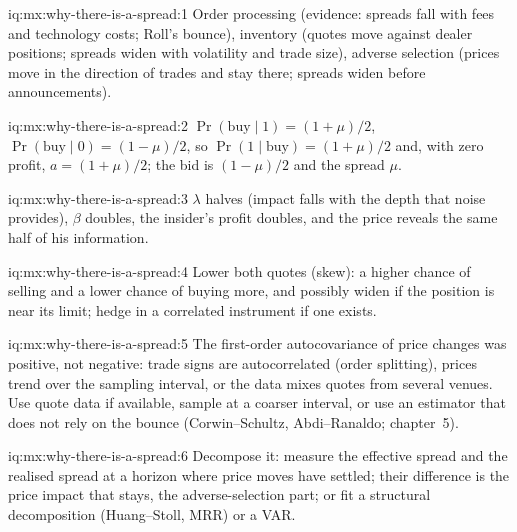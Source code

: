\begin{solution}{iq:mx:why-there-is-a-spread:1}
Order processing (evidence: spreads fall with fees and technology costs; Roll's bounce), inventory (quotes move against dealer positions; spreads widen
with volatility and trade size), adverse selection (prices move in the direction of trades and stay there; spreads widen before announcements).
\end{solution}

\begin{solution}{iq:mx:why-there-is-a-spread:2}
$\Pr(\text{buy}\mid1)=(1+\mu)/2$, $\Pr(\text{buy}\mid0)=(1-\mu)/2$, so $\Pr(1\mid\text{buy})=(1+\mu)/2$ and, with zero profit, $a=(1+\mu)/2$; the bid is
$(1-\mu)/2$ and the spread $\mu$. 
\end{solution}

\begin{solution}{iq:mx:why-there-is-a-spread:3}
$\lambda$ halves (impact falls with the depth that noise provides), $\beta$ doubles, the insider's profit doubles, and the price reveals the same half of his
information. 
\end{solution}

\begin{solution}{iq:mx:why-there-is-a-spread:4}
Lower both quotes (skew): a higher chance of selling and a lower chance of buying more, and possibly widen if the position is near its limit; hedge in a
correlated instrument if one exists. 
\end{solution}

\begin{solution}{iq:mx:why-there-is-a-spread:5}
The first-order autocovariance of price changes was positive, not negative: trade signs are autocorrelated (order splitting), prices trend over the
sampling interval, or the data mixes quotes from several venues. Use quote data if available, sample at a coarser interval, or use an estimator that does
not rely on the bounce (Corwin--Schultz, Abdi--Ranaldo; chapter~5). 
\end{solution}

\begin{solution}{iq:mx:why-there-is-a-spread:6}
Decompose it: measure the effective spread and the realised spread at a horizon where price moves have settled; their difference is the price impact that
stays, the adverse-selection part; or fit a structural decomposition (Huang--Stoll, MRR) or a VAR. 
\end{solution}
